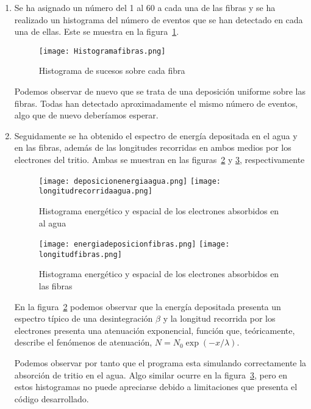 \begin{enumerate}
\item{} Se ha asignado un número del 1 al 60 a cada una de las fibras y se ha realizado un histograma del número de eventos que se han detectado en cada una de ellas. Este se muestra en la figura~\ref{sucesossobrecadafibra}.

\begin{figure}[hbtp]
\centering
\texttt{[image: Histogramafibras.png]}
\caption{Histograma de sucesos sobre cada fibra\label{sucesossobrecadafibra}}
\end{figure}

Podemos observar de nuevo que se trata de una deposición uniforme sobre las fibras. Todas han detectado aproximadamente el mismo número de eventos, algo que de nuevo deberíamos esperar.

\item{} Seguidamente se ha obtenido el espectro de energía depositada en el agua y en las fibras, además de las longitudes recorridas en ambos medios por los electrones del tritio. Ambas se muestran en las figuras~\ref{deposicionagua} y \ref{deposicionfibras}, respectivamente

\begin{figure}[htb]
\centering
{
\texttt{[image: deposicionenergiaagua.png]} 
}
{
\texttt{[image: longitudrecorridaagua.png]} 
}
\caption{Histograma energético y espacial de los electrones absorbidos en al agua\label{deposicionagua}}
\end{figure}

\begin{figure}[htb]
\centering
{
\texttt{[image: energiadeposicionfibras.png]} 
}
{
\texttt{[image: longitudfibras.png]} 
}
\caption{Histograma energético y espacial de los electrones absorbidos en las fibras\label{deposicionfibras}}
\end{figure}

En la figura~\ref{deposicionagua} podemos observar que la energía depositada presenta un espectro típico de una desintegración $\beta$ y la longitud recorrida por los electrones presenta una atenuación exponencial, función que, teóricamente, describe el fenómenos de atenuación, $N=N_0\exp{(-x/\lambda)}$.

Podemos observar por tanto que el programa esta simulando correctamente la absorción de tritio en el agua. Algo similar ocurre en la figura~\ref{deposicionfibras}, pero en estos histogramas no puede apreciarse debido a limitaciones que presenta el código desarrollado.


\end{enumerate}
